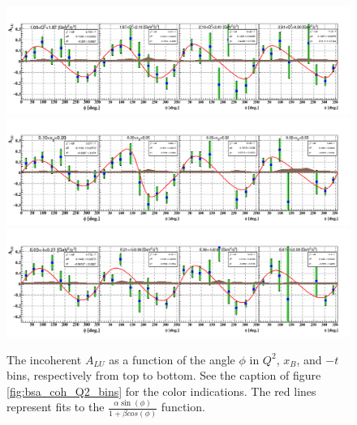 \begin{figure}[tpb]
\includegraphics[scale=0.40]{fig_ch5/incoh_alu_Q2_phi.png}
\includegraphics[scale=0.40]{fig_ch5/incoh_alu_xB_phi.png}
\includegraphics[scale=0.40]{fig_ch5/incoh_alu_t_phi.png}
\caption{The incoherent $A_{LU}$ as a function of the angle $\phi$ in $Q^2$, 
   $x_B$, and $-t$ bins, respectively from top to bottom. See the caption of 
figure \ref{fig:bsa_coh_Q2_bins} for the color indications. The red lines 
represent fits to the $\frac{\alpha \sin(\phi)}{1 + \beta cos(\phi)}$ function.  
} \label{fig:bsa_incoh_bins}
\end{figure}

